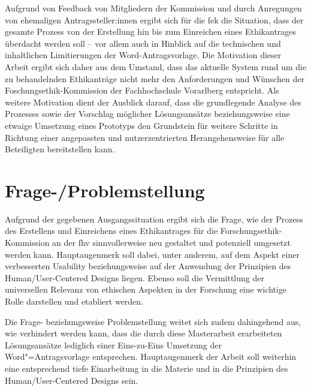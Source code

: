 \documentclass[a4paper,12pt,twoside]{scrreprt}
\begin{document}
\medskip

Aufgrund von Feedback von Mitgliedern der Kommission und durch Anregungen von ehemaligen Antragssteller:innen ergibt sich für die \acl{fek} die Situation, dass der gesamte Prozess von der Erstellung hin bis zum Einreichen eines Ethikantrages überdacht werden soll -- vor allem auch in Hinblick auf die technischen und inhaltlichen Limitierungen der Word-Antragsvorlage. Die Motivation dieser Arbeit ergibt sich daher aus dem Umstand, dass das aktuelle System rund um die zu behandelnden Ethikanträge nicht mehr den Anforderungen und Wünschen der Foschungsethik-Kommission der Fachhochschule Vorarlberg entspricht. Als weitere Motivation dient der Ausblick darauf, dass die grundlegende Analyse des Prozesses sowie der Vorschlag möglicher Lösungsansätze beziehungsweise eine etwaige Umsetzung eines Prototyps den Grundstein für weitere Schritte in Richtung einer angepassten und nutzerzentrierten Herangehensweise für alle Beteiligten bereitstellen kann. 

\section{Frage-/Problemstellung}
\label{sec:frage-problemstellung}

Aufgrund der gegebenen Ausgangssituation ergibt sich die Frage, wie der Prozess des Erstellens und Einreichens eines Ethikantrages für die Forschungsethik-Kommission an der \acl{fhv} sinnvollerweise neu gestaltet und potenziell umgesetzt werden kann. Hauptaugenmerk soll dabei, unter anderem, auf dem Aspekt einer verbesserten Usability beziehungsweise auf der Anwendung der Prinzipien des Human/User-Centered Designs liegen. Ebenso soll die Vermittlung der universellen Relevanz von ethischen Aspekten in der Forschung eine wichtige Rolle darstellen und etabliert werden.

Die Frage- beziehungsweise Problemstellung weitet sich zudem dahingehend aus, wie verhindert werden kann, dass die durch diese Masterarbeit erarbeiteten Lösungsansätze lediglich einer Eins-zu-Eins Umsetzung der Word"=Antragsvorlage entsprechen. Hauptaugenmerk der Arbeit soll weiterhin eine entsprechend tiefe Einarbeitung in die Materie und in die Prinzipien des Human/User-Centered Designs sein.

\medskip
\end{document}
